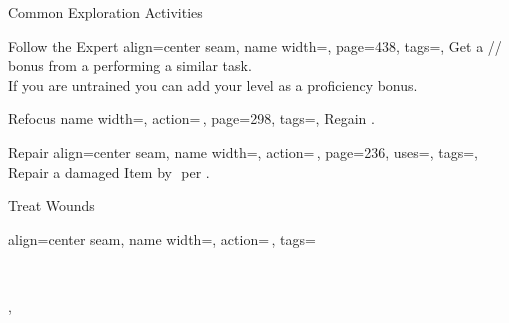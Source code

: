 \renewcommand{\PageBottomReferences}{%
    \hfill APG = Advanced Players Guide
    \hfill GMC = GM Core\\
    \hfill KCG = Kingmaker Companion Guide
    \hfill SoM = Secrets of Magic
    \hfill TV = Treasure Vault
}
\setlength{\parindent}{0mm}%
\begin{PageFront}
    \begin{Tables}{\frontTableHeight}
        \begin{Table}{Common Exploration Activities}
            \begin{entry}{Follow the Expert}{%
                align=center seam,
                name width=\activityLength,%
                page=438,
                tags=\Concentrate,
            }
                Get a \E{}/\M{}/\Le{}\,\Cirm bonus from a 
                performing a similar task.\\
                If you are untrained you can add your level as a proficiency bonus.
            \end{entry}
            \begin{entry}{Refocus}{%
                name width=\activityLength,%
                action=\,,
                page=298,
                tags=\Concentrate,
            }
                Regain  .
            \end{entry}
            \begin{entry}{Repair}{%
                align=center seam,%
                name width=\activityLength,%
                action=\,,
                page=236,
                uses={\Crafting[][before=Item]},%
                tags=\Manipulate,
            }
                Repair a damaged Item by \,\HPs{}\,\HPs per .\\
                \hfill
            \end{entry}
            \begin{entry}{Treat Wounds}{%
                align=center seam,
                name width=\activityLength,%
                action=\,,
                tags=\parbox{0.4\linewidth}{\raggedleft{}\,\Manipulate\Healing\\
                },
}
\end{entry}
\end{Table}
\end{Tables}
\end{PageFront}
